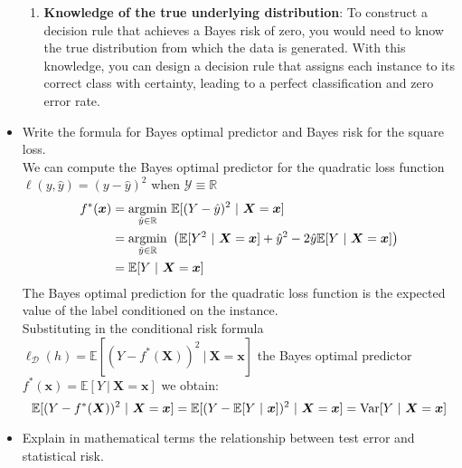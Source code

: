 \begin{itemize}
\begin{enumerate}
            \item \textbf{Knowledge of the true underlying distribution}: To construct a decision rule that achieves a Bayes risk of zero, you would need to know the true distribution from which the data is generated. With this knowledge, you can design a decision rule that assigns each instance to its correct class with certainty, leading to a perfect classification and zero error rate.
        \end{enumerate}
        
    \item Write the formula for Bayes optimal predictor and Bayes risk for the square loss.\\

        We can compute the Bayes optimal predictor for the quadratic loss function $\ell(y, \hat{y}) = (y - \hat{y})^{2}$ when $\mathcal{Y} \equiv \mathbb{R}$\\
        \begin{equation} 
            \begin{split}
                f^{*}(\boldsymbol{x}) & = \underset{\hat{y} \in \mathbb{R}}{\textmd{argmin}}\ \mathbb{E}[(Y - \hat{y})^{2}\ |\ \boldsymbol{X} = \boldsymbol{x}]\\
                                      & = \underset{\hat{y} \in \mathbb{R}}{\textmd{argmin}}\ \left( \mathbb{E}[Y^{2}\ |\ \boldsymbol{X} = \boldsymbol{x}] + \hat{y}^{2} - 2\hat{y} \mathbb{E}[Y\ |\ \boldsymbol{X} = \boldsymbol{x}]\right)\\ 
                                      & = \mathbb{E}[Y\ |\ \boldsymbol{X} = \boldsymbol{x}]\\
            \end{split}
        \end{equation}
        The Bayes optimal prediction for the quadratic loss function is the expected value of the label conditioned on the instance.\\
        Substituting in the conditional risk formula $\ell_{\mathcal{D}}(h) = \mathbb{E}[(Y - f^{*}(\boldsymbol{X}))^{2}\ |\ \boldsymbol{X} = \boldsymbol{x}]$ the Bayes optimal predictor $f^{*}(\boldsymbol{x}) = \mathbb{E}[Y\ |\ \boldsymbol{X} = \boldsymbol{x}]$ we obtain:
        $$
        \mathbb{E}[(Y - f^{*}(\boldsymbol{X}))^{2}\ |\ \boldsymbol{X} = \boldsymbol{x}] = \mathbb{E}[(Y - \mathbb{E}[Y\ |\ \boldsymbol{x}])^{2}\ |\ \boldsymbol{X} = \boldsymbol{x}] = \textmd{Var}[Y\ |\ \boldsymbol{X} = \boldsymbol{x}]
        $$

        \item Explain in mathematical terms the relationship between test error and statistical risk.\\
            

\end{itemize}
